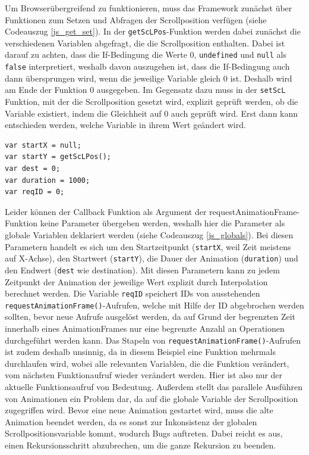 Um Browserübergreifend zu funktionieren, muss das Framework zunächst über Funktionen zum Setzen und Abfragen der Scrollposition verfügen (siehe Codeauszug \ref{js_get_set}). In der \lstinline{getScLPos}-Funktion werden dabei zunächst die verschiedenen Variablen abgefragt, die die Scrollposition enthalten. Dabei ist darauf zu achten, dass die If-Bedingung die Werte 0, \lstinline{undefined} und \lstinline{null} als \lstinline{false} interpretiert, weshalb davon auszugehen ist, dass die If-Bedingung auch dann übersprungen wird, wenn die jeweilige Variable gleich 0 ist. Deshalb wird am Ende der Funktion 0 ausgegeben. Im Gegensatz dazu muss in der \lstinline{setScL} Funktion, mit der die Scrollposition gesetzt wird, explizit geprüft werden, ob die Variable existiert, indem die Gleichheit auf 0 auch geprüft wird. Erst dann kann entschieden werden, welche Variable in ihrem Wert geändert wird.

\begin{lstlisting}[caption=Globale Variablen des Animationsframework., label=js_globals]
var startX = null;
var startY = getScLPos();
var dest = 0;
var duration = 1000;
var reqID = 0;
\end{lstlisting}


Leider können der Callback Funktion als Argument der requestAnimationFrame-Funktion keine Parameter übergeben werden, weshalb hier die Parameter als globale Variablen deklariert werden (siehe Codeauszug \ref{js_globals}). Bei diesen Parametern handelt es sich um den Startzeitpunkt (\lstinline{startX}, weil Zeit meistens auf X-Achse), den Startwert (\lstinline{startY}), die Dauer der Animation (\lstinline{duration}) und den Endwert (\lstinline{dest} wie destination). Mit diesen Parametern kann zu jedem Zeitpunkt der Animation der jeweilige Wert explizit durch Interpolation berechnet werden. Die Variable \lstinline{reqID} speichert IDs von ausstehenden \lstinline{requestAnimationFrame()}-Aufrufen, welche mit Hilfe der ID abgebrochen werden sollten, bevor neue Aufrufe ausgelöst werden, da auf Grund der begrenzten Zeit innerhalb eines AnimationFrames nur eine begrenzte Anzahl an Operationen durchgeführt werden kann. Das Stapeln von \lstinline{requestAnimationFrame()}-Aufrufen ist zudem deshalb unsinnig, da in diesem Beispiel eine Funktion mehrmals durchlaufen wird, wobei alle relevanten Variablen, die die Funktion verändert, vom nächsten Funktionaufruf wieder verändert werden. Hier ist also nur der aktuelle Funktionsaufruf von Bedeutung. Außerdem stellt das parallele Ausführen von Animationen ein Problem dar, da auf die globale Variable der Scrollposition zugegriffen wird. Bevor eine neue Animation gestartet wird, muss die alte Animation beendet werden, da es sonst zur Inkonsistenz der globalen Scrollpositionsvariable kommt, wodurch Bugs auftreten. Dabei reicht es aus, einen Rekursionsschritt abzubrechen, um die ganze Rekursion zu beenden.

